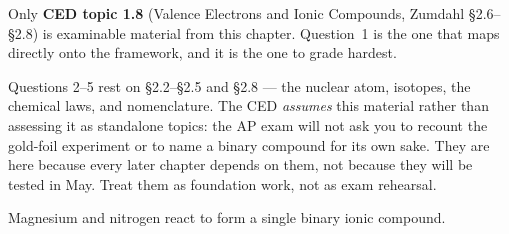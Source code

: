 \documentclass{apchem-exam}
\begin{document}
\apctitleblock

\begin{apcnote}
Only \textbf{CED topic 1.8} (Valence Electrons and Ionic Compounds,
Zumdahl \S2.6--\S2.8) is examinable material from this chapter. Question~1
is the one that maps directly onto the framework, and it is the one to
grade hardest.

Questions 2--5 rest on \S2.2--\S2.5 and \S2.8 --- the nuclear atom,
isotopes, the chemical laws, and nomenclature. The CED \emph{assumes}
this material rather than assessing it as standalone topics: the AP exam
will not ask you to recount the gold-foil experiment or to name a binary
compound for its own sake. They are here because every later chapter
depends on them, not because they will be tested in May. Treat them as
foundation work, not as exam rehearsal.
\end{apcnote}



Magnesium and nitrogen react to form a single binary ionic compound.
\end{document}
